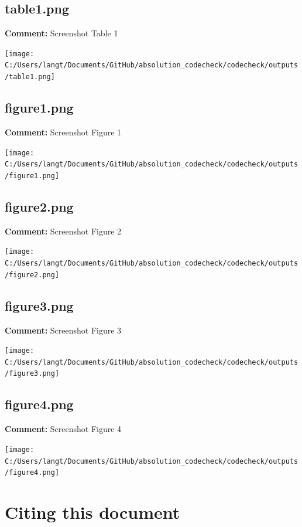 \documentclass[
]{article}
\begin{document}
\subsection{table1.png}\label{table1.png}

\textbf{Comment:} Screenshot Table 1

\texttt{[image: C:/Users/langt/Documents/GitHub/absolution\_codecheck/codecheck/outputs/table1.png]}
\clearpage 

\subsection{figure1.png}\label{figure1.png}

\textbf{Comment:} Screenshot Figure 1

\texttt{[image: C:/Users/langt/Documents/GitHub/absolution\_codecheck/codecheck/outputs/figure1.png]}
\clearpage 

\subsection{figure2.png}\label{figure2.png}

\textbf{Comment:} Screenshot Figure 2

\texttt{[image: C:/Users/langt/Documents/GitHub/absolution\_codecheck/codecheck/outputs/figure2.png]}
\clearpage 

\subsection{figure3.png}\label{figure3.png}

\textbf{Comment:} Screenshot Figure 3

\texttt{[image: C:/Users/langt/Documents/GitHub/absolution\_codecheck/codecheck/outputs/figure3.png]}
\clearpage 

\subsection{figure4.png}\label{figure4.png}

\textbf{Comment:} Screenshot Figure 4

\texttt{[image: C:/Users/langt/Documents/GitHub/absolution\_codecheck/codecheck/outputs/figure4.png]}
\clearpage 

\clearpage

\section{Citing this document}\label{citing-this-document}
\end{document}
